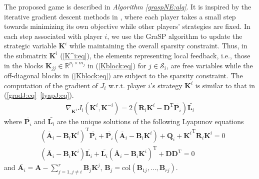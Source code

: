 \documentclass[12pt, draftclsnofoot,onecolumn]{IEEEtran}
\begin{document}
The proposed game is described in {\it Algorithm \ref{graspNE:alg}}. It is inspired by the iterative gradient descent methods in \cite{ratliff2013characterization,li2013designing}, where each player takes a small step towards minimizing its own objective while other players' strategies are fixed. In each step associated with player $i$, we use the GraSP algorithm \cite{bahmani2013greedy} to update the strategic variable ${\boldsymbol K}^i$ while maintaining the overall sparsity constraint. Thus, in the submatrix ${\boldsymbol K}^i$ (\ref{K^i:eq}), the elements representing local feedback, i.e., those in the blocks ${\boldsymbol K}_{jj} \in \mathbb{R}^{p_j\times m_j}$ in (\ref{Kblock:eq}) for $j\in \mathcal S_i$, are free variables while the off-diagonal blocks in (\ref{Kblock:eq}) are subject to the sparsity constraint. The computation of the gradient of $J_i$ w.r.t. player $i$'s strategy $\boldsymbol K^{i}$ is similar to that in (\ref{gradJ:eq}--\ref{lyapJ:eq}).
\begin{align}
\nabla_{{\boldsymbol K}^i}J_i({\boldsymbol K}^i,{\boldsymbol K}^{-i}) = 2(\boldsymbol R_i\boldsymbol K^{i} - \boldsymbol D^{\mathrm{T}}\bar{\boldsymbol P_i})\bar{\boldsymbol L_i}
\end{align}
\noindent where $\bar{\boldsymbol P_i}$ and $\bar{\boldsymbol L_i}$ are the unique solutions of the following Lyapunov equations
\begin{align}
&(\bar{\boldsymbol A}_i - \boldsymbol B_i\boldsymbol K^{i})^{\mathrm{T}}\bar{\boldsymbol P_i} + \bar{\boldsymbol P_i}(\bar{\boldsymbol A}_i - \boldsymbol B_i\boldsymbol K^{i}) + \boldsymbol Q_i + {\boldsymbol K^{i}}^{\mathrm{T}}\boldsymbol R_i \boldsymbol K^i = 0\nonumber\\
&(\bar{\boldsymbol A}_i - \boldsymbol B_i\boldsymbol K^{i})\bar{\boldsymbol L_i} + \bar{\boldsymbol L_i}(\bar{\boldsymbol A}_i - \boldsymbol B_i\boldsymbol K^{i})^{\mathrm{T}} + \boldsymbol D\boldsymbol D^{\mathrm{T}} = 0
\end{align}
\noindent and $\bar{\boldsymbol A_i}=\boldsymbol A -\sum_{j=1,j\neq i}^{r}{\boldsymbol B_j\boldsymbol K^j}$, $\boldsymbol B_j = \mathrm{col}(\boldsymbol B_{1j},...,\boldsymbol B_{rj})$.
\end{document}
